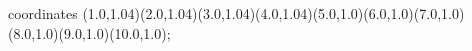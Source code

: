 					coordinates { (1.0,1.04)(2.0,1.04)(3.0,1.04)(4.0,1.04)(5.0,1.0)(6.0,1.0)(7.0,1.0)(8.0,1.0)(9.0,1.0)(10.0,1.0)};
